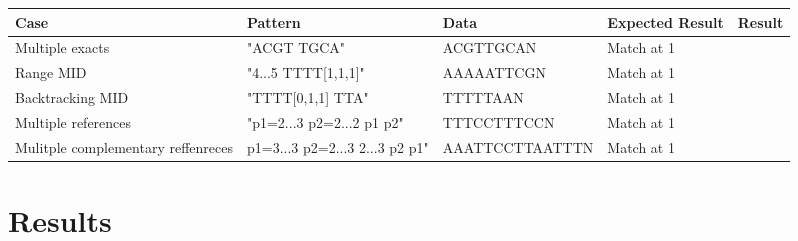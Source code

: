 \documentclass[12pt]{article}
\newcommand{\textapprox}{\raisebox{0.5ex}{\texttildelow}}
\begin{document}
 \begin{table}[h]
\begin{tabular}{p{4cm}|l|l|p{3cm}|l}
Case 			& Pattern & Data & Expected Result & Result \\ \hline
Multiple exacts 	& "ACGT TGCA" & ACGTTGCAN & Match at 1 & \\ \hline
Range MID		& "4...5 TTTT[1,1,1]" & AAAAATTCGN & Match at 1 & \\ \hline
Backtracking MID & "TTTT[0,1,1] TTA" & TTTTTAAN & Match at 1 & \\ \hline
Multiple references & "p1=2...3 p2=2...2 p1 p2" & TTTCCTTTCCN & Match at 1 & \\ \hline
Mulitple complementary reffenreces & p1=3...3 p2=2...3 2...3 \textapprox p2 \textapprox p1" & AAATTCCTTAATTTN & Match at 1 &

\end{tabular}
\end{table}



\section{Results}

\printbibliography
\end{document}
